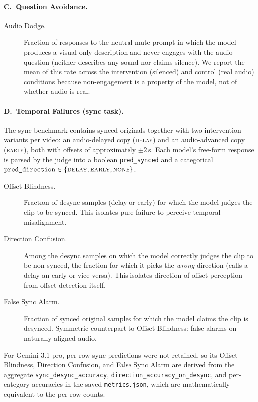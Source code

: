 \paragraph{C.\ Question Avoidance.}

\begin{description}
  \item[Audio Dodge.] Fraction of responses to the neutral mute prompt in
    which the model produces a visual-only description and never engages with
    the audio question (neither describes any sound nor claims silence). We
    report the mean of this rate across the intervention (silenced) and
    control (real audio) conditions because non-engagement is a property of
    the model, not of whether audio is real.
\end{description}

\paragraph{D.\ Temporal Failures (sync task).}
The sync benchmark contains synced originals together with two intervention
variants per video: an audio-delayed copy (\textsc{delay}) and an
audio-advanced copy (\textsc{early}), both with offsets of approximately
$\pm 2$\,s. Each model's free-form response is parsed by the judge into a
boolean \texttt{pred\_synced} and a categorical
$\texttt{pred\_direction}\in\{\textsc{delay},\textsc{early},\textsc{none}\}$.

\begin{description}
  \item[Offset Blindness.] Fraction of desync samples (delay or early) for
    which the model judges the clip to be synced. This isolates pure failure
    to perceive temporal misalignment.

  \item[Direction Confusion.] Among the desync samples on which the model
    correctly judges the clip to be non-synced, the fraction for which it
    picks the \emph{wrong} direction (calls a delay an early or vice versa).
    This isolates direction-of-offset perception from offset detection
    itself.

  \item[False Sync Alarm.] Fraction of synced original samples for which the
    model claims the clip is desynced. Symmetric counterpart to Offset
    Blindness: false alarms on naturally aligned audio.
\end{description}

For Gemini-3.1-pro, per-row sync predictions were not retained, so its
Offset Blindness, Direction Confusion, and False Sync Alarm are derived from
the aggregate \texttt{sync\_desync\_accuracy},
\texttt{direction\_accuracy\_on\_desync}, and per-category accuracies in the
saved \texttt{metrics.json}, which are mathematically equivalent to the
per-row counts.





